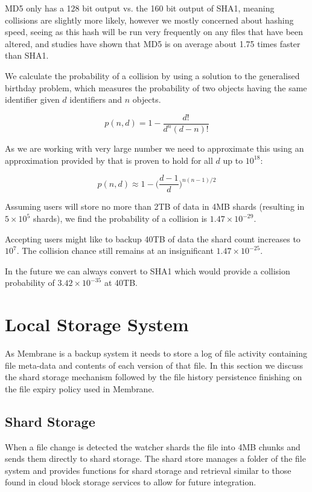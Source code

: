 \documentclass[11pt, a4paper, twocolumn, twoside]{report}
\begin{document}
MD5 only has a 128 bit output vs. the 160 bit output of SHA1, meaning collisions are slightly more likely, however we mostly concerned about hashing speed, seeing as this hash will be run very frequently on any files that have been altered, and studies have shown that MD5 is on average about 1.75 times faster than SHA1. \citep{saphir2007securite}

We calculate the probability of a collision by using a solution to the generalised birthday problem, which measures the probability of two objects having the same identifier given $d$ identifiers and $n$ objects.

$$p(n, d) = 1 - \frac{d!}{d^{n}(d - n)!}$$

As we are working with very large number we need to approximate this using an approximation provided by \cite{brink2012probably} that is proven to hold for all $d$ up to $10^{18}$:

$$p(n, d) \approx 1 - \bigg(\frac{d-1}{d}\bigg)^{n(n-1)/2}$$

Assuming users will store no more than 2TB of data in 4MB shards (resulting in $5 \times 10^5$ shards), we find the probability of a collision is $1.47 \times 10^{-29}$.

Accepting users might like to backup 40TB of data the shard count increases to $10^{7}$. The collision chance still remains at an insignificant $1.47 \times 10^{-25}$.

In the future we can always convert to SHA1 which would provide a collision probability of $3.42 \times 10^{-35}$ at 40TB.

\section{Local Storage System}

As Membrane is a backup system it needs to store a log of file activity containing file meta-data and contents of each version of that file. In this section we discuss the shard storage mechanism followed by the file history persistence finishing on the file expiry policy used in Membrane.

\subsection{Shard Storage}

When a file change is detected the watcher shards the file into 4MB chunks and sends them directly to shard storage. The shard store manages a folder of the file system and provides functions for shard storage and retrieval similar to those found in cloud block storage services to allow for future integration.
\end{document}
